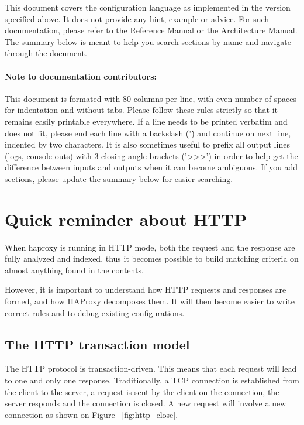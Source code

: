 \maketitle
\tableofcontents
\listoffigures
\newpage

This document covers the configuration language as implemented in the version
specified above. It does not provide any hint, example or advice. For such
documentation, please refer to the Reference Manual or the Architecture Manual.
The summary below is meant to help you search sections by name and navigate
through the document.

\subsubsection*{Note to documentation contributors:}
This document is formated with 80 columns per line, with even number of
spaces for indentation and without tabs. Please follow these rules strictly
so that it remains easily printable everywhere. If a line needs to be
printed verbatim and does not fit, please end each line with a backslash
('\') and continue on next line, indented by two characters. It is also
sometimes useful to prefix all output lines (logs, console outs) with 3
closing angle brackets ('>>>') in order to help get the difference between
inputs and outputs when it can become ambiguous. If you add sections,
please update the summary below for easier searching.


\chapter{Quick reminder about HTTP}
When haproxy is running in HTTP mode, both the request and the response are
fully analyzed and indexed, thus it becomes possible to build matching criteria
on almost anything found in the contents.

However, it is important to understand how HTTP requests and responses are
formed, and how HAProxy decomposes them. It will then become easier to write
correct rules and to debug existing configurations.

\section{The HTTP transaction model}
The HTTP protocol is transaction-driven. This means that each request will lead
to one and only one response. Traditionally, a TCP connection is established
from the client to the server, a request is sent by the client on the
connection, the server responds and the connection is closed. A new request
will involve a new connection as shown on Figure ~\ref{fig:http_close}.

